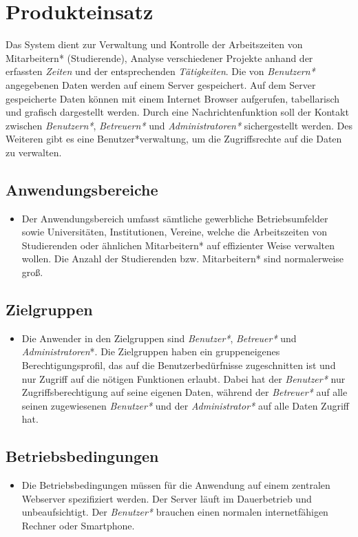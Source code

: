 \section{Produkteinsatz}
Das System dient zur Verwaltung und Kontrolle der Arbeitszeiten von Mitarbeitern* (Studierende), Analyse verschiedener Projekte anhand der erfassten \emph{Zeiten} und der entsprechenden \emph{Tätigkeiten}.
Die von \emph{Benutzern*} angegebenen Daten werden auf einem Server gespeichert. Auf dem Server gespeicherte Daten können mit einem Internet Browser aufgerufen, tabellarisch und grafisch dargestellt werden.
Durch eine Nachrichtenfunktion soll der Kontakt zwischen \emph{Benutzern*}, \emph{Betreuern*} und \emph{Administratoren*} sichergestellt werden.
Des Weiteren gibt es eine Benutzer*verwaltung, um die Zugriffsrechte auf die Daten zu verwalten.
\subsection{Anwendungsbereiche}
\begin{itemize}
	\item Der Anwendungsbereich umfasst sämtliche gewerbliche Betriebsumfelder sowie Universitäten, Institutionen, Vereine,
	welche die Arbeitszeiten von Studierenden oder ähnlichen Mitarbeitern* auf effizienter Weise verwalten wollen. Die Anzahl der Studierenden bzw. Mitarbeitern* sind normalerweise groß.
\end{itemize}

\subsection{Zielgruppen}
\begin{itemize}
	\item Die Anwender in den Zielgruppen sind \emph{Benutzer*}, \emph{Betreuer*} und \emph{Administratoren}*.
	Die Zielgruppen haben ein gruppeneigenes Berechtigungsprofil, das auf die Benutzerbedürfnisse zugeschnitten ist und nur Zugriff auf die nötigen Funktionen erlaubt.
	Dabei hat der \emph{Benutzer*} nur Zugriffsberechtigung auf seine eigenen Daten, während der \emph{Betreuer*} auf alle seinen zugewiesenen \emph{Benutzer*} und der \emph{Administrator*} auf alle Daten Zugriff hat.
\end{itemize}

\subsection{Betriebsbedingungen}
\begin{itemize}
	\item Die Betriebsbedingungen müssen für die Anwendung auf einem zentralen Webserver spezifiziert werden. Der Server läuft im Dauerbetrieb und unbeaufsichtigt.
	Der \emph{Benutzer*} brauchen einen normalen internetfähigen Rechner oder Smartphone.
\end{itemize}
